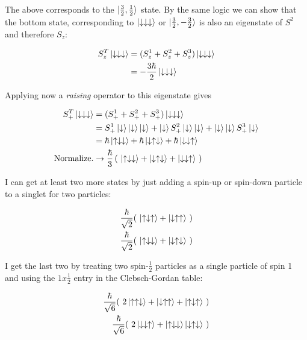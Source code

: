 \documentclass[paper=a4, fontsize=11pt]{scrartcl} %
\numberwithin{equation}{section} %
\numberwithin{figure}{section} %
\numberwithin{table}{section} %
\begin{document}
The above corresponds to the $\ket{\frac{3}{2}, \frac{1}{2}}$ state. By the same logic we can show that the bottom state, corresponding to $\ket{\downarrow \downarrow \downarrow}$ or $\ket{\frac{3}{2}, -\frac{3}{2}}$ is also an eigenstate of $S^2$ and therefore $S_z$:

\begin{align}
S^T_z\ket{\downarrow \downarrow \downarrow} &= (S^1_z + S^2_z + S^3_z)\ket{\downarrow \downarrow \downarrow} \\
&= -\frac{3\hbar}{2}\ket{\downarrow \downarrow \downarrow}
\end{align}

Applying now a \textit{raising} operator to this eigenstate gives

\begin{align}
S^T_+\ket{\downarrow \downarrow \downarrow} &= (S^1_+ + S^2_+ + S^3_+)\ket{\downarrow \downarrow \downarrow} \\
&= S^1_+\ket{\downarrow}\ket{\downarrow}\ket{\downarrow} + \ket{\downarrow}S^2_+\ket{\downarrow}\ket{\downarrow} + \ket{\downarrow}\ket{\downarrow}S^3_+\ket{\downarrow} \\
&= \hbar \ket{\uparrow \downarrow \downarrow} + \hbar \ket{\downarrow \uparrow \downarrow} + \hbar \ket{\downarrow \downarrow \uparrow} \\
\text{Normalize.} &\rightarrow \frac{\hbar}{3} \left( \ \ket{\uparrow \downarrow \downarrow} + \ket{\downarrow \uparrow \downarrow} + \ket{\downarrow \downarrow \uparrow} \ \right)
\end{align}

I can get at least two more states by just adding a spin-up or spin-down particle to a singlet for two particles:

\begin{align}
\frac{\hbar}{\sqrt{2}}( \ \ket{\uparrow \downarrow \uparrow} + \ket{\downarrow \uparrow \uparrow} \ ) \\
\frac{\hbar}{\sqrt{2}}( \ \ket{\uparrow \downarrow \downarrow} + \ket{\downarrow \uparrow \downarrow} \ )
\end{align}

I get the last two by treating two spin-$\frac{1}{2}$ particles as a single particle of spin 1 and using the $1x\frac{1}{2}$ entry in the Clebsch-Gordan table:

\begin{align}
\frac{\hbar}{\sqrt{6}}( \ 2\ket{\uparrow \uparrow \downarrow} + \ket{\downarrow \uparrow \uparrow} + \ket{\uparrow \downarrow \uparrow} \ ) \\
\frac{\hbar}{\sqrt{6}}( \ 2\ket{\downarrow \downarrow \uparrow} + \ket{\uparrow \downarrow \downarrow} \ket{\downarrow \uparrow \downarrow} \ )
\end{align}
\end{document}
